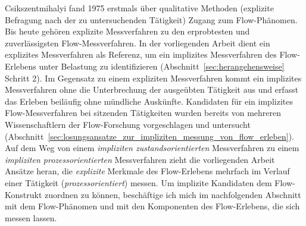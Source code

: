

Csikszentmihalyi fand 1975 erstmals über qualitative Methoden (explizite Befragung nach der zu untersuchenden Tätigkeit) Zugang zum Flow-Phänomen. Bis heute gehören explizite Messverfahren zu den erprobtesten und zuverlässigsten Flow-Messverfahren. In der vorliegenden Arbeit dient ein explizites Messverfahren als Referenz, um ein implizites Messverfahren des Flow-Erlebens unter Belastung zu identifizieren (Abschnitt~\ref{sec:herangehensweise} Schritt 2). Im Gegensatz zu einem expliziten Messverfahren kommt ein implizites Messverfahren ohne die Unterbrechung der ausgeübten Tätigkeit aus und erfasst das Erleben beiläufig ohne mündliche Auskünfte. Kandidaten für ein implizites Flow-Messverfahren bei sitzenden Tätigkeiten wurden bereits von mehreren Wissenschaftlern der Flow-Forschung vorgeschlagen und untersucht (Abschnitt~\ref{sec:losungsansatze_zur_impliziten_messung_von_flow_erleben}). Auf dem Weg von einem \emph{impliziten zustandsorientierten} Messverfahren zu einem \emph{impliziten prozessorientierten} Messverfahren zieht die vorliegenden Arbeit Ansätze heran, die \emph{explizite} Merkmale des Flow-Erlebens mehrfach im Verlauf einer Tätigkeit (\emph{prozessorientiert}) messen. Um implizite Kandidaten dem Flow-Konstrukt zuordnen zu können, beschäftige ich mich im nachfolgenden Abschnitt mit dem Flow-Phänomen und mit den Komponenten des Flow-Erlebens, die sich messen lassen.

